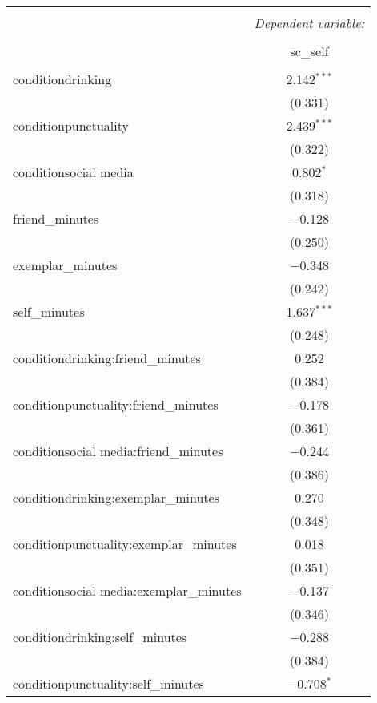 
\begin{table}[!htbp] \centering 
  \caption{} 
  \label{} 
\begin{tabular}{@{\extracolsep{5pt}}lc} 
\\[-1.8ex]\hline 
\hline \\[-1.8ex] 
 & \multicolumn{1}{c}{\textit{Dependent variable:}} \\ 
\cline{2-2} 
\\[-1.8ex] & sc\_self \\ 
\hline \\[-1.8ex] 
 conditiondrinking & 2.142$^{***}$ \\ 
  & (0.331) \\ 
  conditionpunctuality & 2.439$^{***}$ \\ 
  & (0.322) \\ 
  conditionsocial media & 0.802$^{*}$ \\ 
  & (0.318) \\ 
  friend\_minutes & $-$0.128 \\ 
  & (0.250) \\ 
  exemplar\_minutes & $-$0.348 \\ 
  & (0.242) \\ 
  self\_minutes & 1.637$^{***}$ \\ 
  & (0.248) \\ 
  conditiondrinking:friend\_minutes & 0.252 \\ 
  & (0.384) \\ 
  conditionpunctuality:friend\_minutes & $-$0.178 \\ 
  & (0.361) \\ 
  conditionsocial media:friend\_minutes & $-$0.244 \\ 
  & (0.386) \\ 
  conditiondrinking:exemplar\_minutes & 0.270 \\ 
  & (0.348) \\ 
  conditionpunctuality:exemplar\_minutes & 0.018 \\ 
  & (0.351) \\ 
  conditionsocial media:exemplar\_minutes & $-$0.137 \\ 
  & (0.346) \\ 
  conditiondrinking:self\_minutes & $-$0.288 \\ 
  & (0.384) \\ 
  conditionpunctuality:self\_minutes & $-$0.708$^{*}$ \\ 

\end{tabular}
\end{table}
